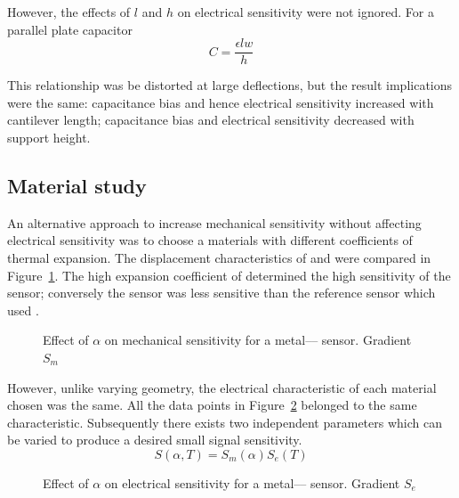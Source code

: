 \documentclass[a4paper,10pt,twocolumn]{article}
\begin{document}
However, the effects of $l$ and $h$ on electrical sensitivity were not ignored.
For a parallel plate capacitor
\begin{equation} \label{eq:C}
    C = \frac{\epsilon lw}{h}
\end{equation}

This relationship was be distorted at large deflections,
but the result implications were the same: capacitance bias and hence
electrical sensitivity increased with cantilever length; capacitance bias
and electrical sensitivity decreased with support height.

\subsection{Material study}

An alternative approach to increase mechanical sensitivity without affecting
electrical sensitivity was to choose a materials with different coefficients of
thermal expansion. The displacement characteristics of  and  were
compared in Figure~\ref{fig:material-S_m}. The high expansion coefficient of
 determined the high sensitivity of the  sensor; conversely 
the  sensor was less sensitive than the reference sensor which used 
.

\begin{figure}[h]
    \centering
    \begin{footnotesize}
        
    \end{footnotesize}
    \caption{Effect of $\alpha$ on mechanical sensitivity for a 
        metal---- sensor. Gradient $S_m$}
    \label{fig:material-S_m}
\end{figure}

However, unlike varying geometry, the electrical characteristic of each material
chosen was the same. All the data points in Figure~\ref{fig:material-S_e}
belonged to the same characteristic. Subsequently there exists two independent
parameters which can be varied to produce a desired small signal sensitivity.
\begin{equation}
    S(\alpha,T) = S_m(\alpha)S_e(T)
\end{equation}

\begin{figure}[h]
    \centering
    \begin{footnotesize}
        
    \end{footnotesize}
    \caption{Effect of $\alpha$ on electrical sensitivity for a
        metal---- sensor. Gradient $S_e$}
    \label{fig:material-S_e}
\end{figure}
\end{document}
